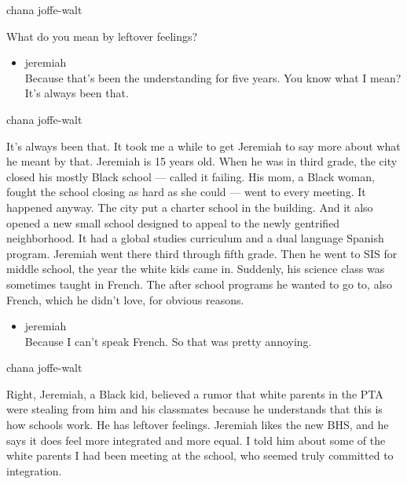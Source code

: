 chana joffe-walt

What do you mean by leftover feelings?

\begin{itemize}
\tightlist
\item
  jeremiah\\
  Because that's been the understanding for five years. You know what I
  mean? It's always been that.
\end{itemize}

chana joffe-walt

It's always been that. It took me a while to get Jeremiah to say more
about what he meant by that. Jeremiah is 15 years old. When he was in
third grade, the city closed his mostly Black school --- called it
failing. His mom, a Black woman, fought the school closing as hard as
she could --- went to every meeting. It happened anyway. The city put a
charter school in the building. And it also opened a new small school
designed to appeal to the newly gentrified neighborhood. It had a global
studies curriculum and a dual language Spanish program. Jeremiah went
there third through fifth grade. Then he went to SIS for middle school,
the year the white kids came in. Suddenly, his science class was
sometimes taught in French. The after school programs he wanted to go
to, also French, which he didn't love, for obvious reasons.

\begin{itemize}
\tightlist
\item
  jeremiah\\
  Because I can't speak French. So that was pretty annoying.
\end{itemize}

chana joffe-walt

Right, Jeremiah, a Black kid, believed a rumor that white parents in the
PTA were stealing from him and his classmates because he understands
that this is how schools work. He has leftover feelings. Jeremiah likes
the new BHS, and he says it does feel more integrated and more equal. I
told him about some of the white parents I had been meeting at the
school, who seemed truly committed to integration.

